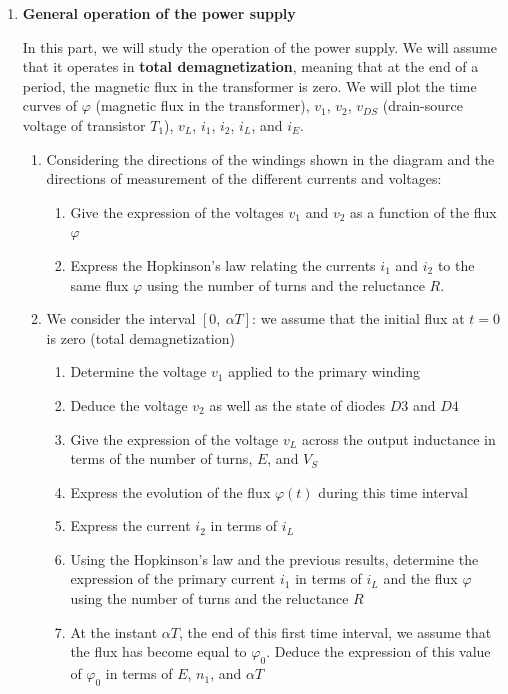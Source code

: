 \begin{enumerate}
\item \textbf{General operation of the power supply}

In this part, we will study the operation of the power supply. We will assume that it operates in \textbf{total demagnetization}, meaning that at the end of a period, the magnetic flux in the transformer is zero. We will plot the time curves of $\varphi$ (magnetic flux in the transformer), $v_1$, $v_2$, $v_{DS}$ (drain-source voltage of transistor $T_1$), $v_L$, $i_1$, $i_2$, $i_L$, and $i_E$.

\begin{enumerate}

\item Considering the directions of the windings shown in the diagram and the directions of measurement of the different currents and voltages:
\begin{enumerate}
\item Give the expression of the voltages $v_1$ and $v_2$ as a function of the flux $\varphi$
\item Express the Hopkinson's law relating the currents $i_1$ and $i_2$ to the same flux $\varphi$ using the number of turns and the reluctance $R$.
\end{enumerate}

\item We consider the interval $[0,\ \alpha T]$: we assume that the initial flux at $t = 0$ is zero (total demagnetization)
\begin{enumerate}
\item Determine the voltage $v_1$ applied to the primary winding
\item Deduce the voltage $v_2$ as well as the state of diodes $D3$ and $D4$
\item Give the expression of the voltage $v_L$ across the output inductance in terms of the number of turns, $E$, and $V_S$
\item Express the evolution of the flux $\varphi (t)$ during this time interval
\item Express the current $i_2$ in terms of $i_L$
\item Using the Hopkinson's law and the previous results, determine the expression of the primary current $i_1$ in terms of $i_L$ and the flux $\varphi$ using the number of turns and the reluctance $R$
\item At the instant $\alpha T$, the end of this first time interval, we assume that the flux has become equal to $\varphi_0$. Deduce the expression of this value of $\varphi_0$ in terms of $E$, $n_1$, and $\alpha T$
\end{enumerate}


\end{enumerate}
\end{enumerate}
